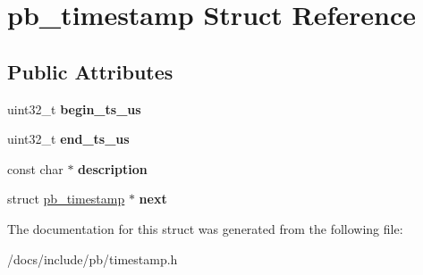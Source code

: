 \hypertarget{structpb__timestamp}{}\section{pb\+\_\+timestamp Struct Reference}
\label{structpb__timestamp}
\subsection*{Public Attributes}
\begin{DoxyCompactItemize}
\item 
\mbox{\label{structpb__timestamp_ab691fdd70fcbecbc0434a6dd6ca4e20f}} 
uint32\+\_\+t {\bfseries begin\+\_\+ts\+\_\+us}
\item 
\mbox{\label{structpb__timestamp_adbb3b12132d65cad2398c2b418b5b7a6}} 
uint32\+\_\+t {\bfseries end\+\_\+ts\+\_\+us}
\item 
\mbox{\label{structpb__timestamp_a6467d5961245604922fa4af84f86ef7f}} 
const char $\ast$ {\bfseries description}
\item 
\mbox{\label{structpb__timestamp_a29a900b3e1026bdd935e9523fa39b937}} 
struct \hyperlink{structpb__timestamp}{pb\+\_\+timestamp} $\ast$ {\bfseries next}
\end{DoxyCompactItemize}


The documentation for this struct was generated from the following file\+:\begin{DoxyCompactItemize}
\item 
/docs/include/pb/timestamp.\+h\end{DoxyCompactItemize}
